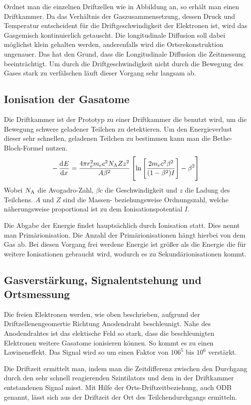 \documentclass[11pt, ngerman, fleqn, DIV=15, headinclude, BCOR=2cm]{scrreprt}
\begin{document}
Ordnet man die einzelnen Driftzellen wie in Abbildung \fehlt an, so erhält man einen Driftkammer.
Da das Verhältnis der Gaszusammensetzung, dessen Druck und Temperatur entscheident für die Driftgeschwindigkeit der Elektronen ist, wird das Gasgemisch kontinuierlich getauscht. 
Die longitudinale Diffusion soll dabei möglichst klein gehalten werden,
anderenfalls wird die Ortsrekonstruktion ungenauer.
Das hat den Grund, dass die Longitudinale Diffusion die Zeitmessung beeinträchtigt.
Um durch die Driftgeschwindigkeit nicht durch die Bewegung des Gases stark zu verfälschen läuft dieser Vorgang sehr langsam ab.

\subsection{Ionisation der Gasatome}
Die Driftkammer ist der Prototyp zu einer Driftkammer die benutzt wird, um
die Bewegung schwere geladener Teilchen zu detektieren.
Um den Energieverlust dieser sehr schnellen, geladenen Teilchen zu bestimmen kann man die Bethe-Bloch-Formel nutzen.
\[
    -\dod Ex = \frac{4 \pi r^2_e m_e c^2 N_\text{A} Z z^2}{A \beta^2}\sbr{\ln\sbr{\frac{2m_e c^2 \beta^2}{(1-\beta^2)I}}-\beta^2}
\]
Wobei $N_\text A$ die Avogadro-Zahl, $\beta c$ die Geschwindigkeit und $z$ die Ladung des Teilchens. $A$ und $Z$ sind die Massen- beziehungsweise Ordnungszahl, welche näherungsweise proportional ist zu dem Ionisationspotential $I$.

Die Abgabe der Energie findet hauptsächlich durch Ionisation statt.
Dies nennt man Primärionisation.
Die Anzahl der Primärionisationen hängt hierbei von dem Gas ab.
Bei diesen Vorgang frei werdene Energie ist größer als die Energie die für weitere Ionisationen gebraucht wird, wodurch es zu Sekundärionisationen kommt.

\subsection{Gasverstärkung, Signalentstehung und Ortsmessung}
Die freien Elektronen werden, wie oben beschrieben, aufgrund der Driftzellenengeomertie Richtung Anodendraht beschleunigt. 
Nahe des Anodendrahtes ist das elektische Feld so stark, dass die beschleunigten Elektronen weitere Gasatome ionisieren können.
So kommt es zu einen Lawineneffekt.
Das Signal wird so um einen Faktor von $106^5$ bis $10^6$ verstärkt.

Die Driftzeit ermittelt man, indem man die Zeitdifferenz zwischen den Durchgang durch den sehr schnell reagierenden Szintilators und dem in der Driftkammer entstandenen Signal misst.
Mit Hilfe der Orts-Driftzeitbeziehung, auch ODB genannt, lässt sich aus der Driftzeit der Ort des Teilchendurchgangs ermitteln.
\end{document}
